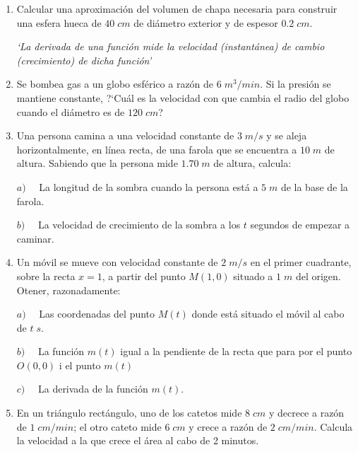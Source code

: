 \begin{enumerate}
		\rightline{\textcolor{gris}{Solución: $0.017 \; m$}}
		
		\item Calcular una aproximación del volumen de chapa necesaria para construir una esfera hueca de $40\; cm$ de diámetro exterior y de espesor $0.2\; cm$.
		
		\rightline{\textcolor{gris}{Solución: $320\pi\; cm^3$}}
		
		\emph{`La derivada de una función mide la velocidad (instantánea) de cambio (crecimiento) de dicha función'}
		
		\item Se bombea gas a un globo esférico a razón de $6 \; m^3/min$. Si la presión se mantiene constante, ?`Cuál es la velocidad con que cambia el radio del globo cuando el diámetro es de $120\; cm$?
		
		\rightline{\textcolor{gris}{Solución: $1.326\; m/min$}}
		
		\item Una persona camina a una velocidad constante de $3\; m/s$ y se aleja horizontalmente, en línea recta, de una farola que se encuentra a $10\; m$ de altura. Sabiendo que la persona mide $1.70\; m$ de altura, calcula:
		
			$a)\quad $ La longitud de la sombra cuando la persona está a $5 \; m$ de la base de la farola.
			
			$b)\quad$ La velocidad de crecimiento de la sombra a los $t$ segundos de empezar a caminar.
			
		
		\rightline{\textcolor{gris}{Solución: $1.024\; m; \quad 0.614\; m/s$ }}
		
		\item Un móvil se mueve con velocidad constante de $2 \; m/s$ en el primer cuadrante, sobre la recta $x=1$, a partir del punto $M(1,0)$ situado a $1\; m$ del origen. Otener, razonadamente:
		
		$a) \quad$ Las coordenadas del punto $M(t)$ donde está situado el móvil al cabo de $t\; s$.
		
		$b) \quad$ La función $m(t)$ igual a la pendiente de la recta que para por el punto $O(0,0)$ i el punto $m(t)$
		
		$c) \quad$ La derivada de la función $m(t)$.
		
		\rightline{\textcolor{gris}{Solución: $M(t)=(1,2t);\quad m(t)=2t;\quad m'(t)=2$}}
		
		\item En un triángulo rectángulo, uno de los catetos mide $8\; cm$ y decrece a razón de $1\; cm/min$; el otro cateto mide $6\; cm$ y crece a razón de $2\; cm/min$. Calcula la velocidad a la que crece el área al cabo de 2 minutos.
		

\end{enumerate}
